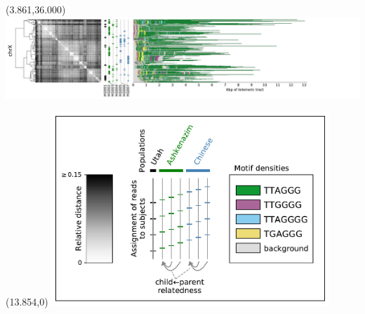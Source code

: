 \documentclass{article}
\begin{document}
\begin{textblock}{13}(3.861,36.000)\includegraphics{haplotypes/chrX.pdf}\end{textblock}
\begin{textblock}{13}(13.854,0)
\includegraphics[width=4.121in,keepaspectratio]{haplotypes/haplotypes-legend.pdf}
\end{textblock}
\end{document}
